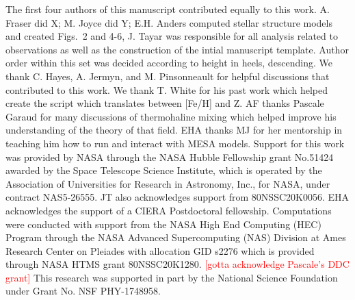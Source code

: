 \documentclass[linenumbers,twocolumn]{aastex62}
\begin{document}
\begin{comment}
\begin{figure}[!htb]
\begin{center}
\texttt{[image: ./Figs/protversusloggmodelpmmPYboth.eps]}%
\caption{The measured core rotation rates for the stars in our sample as a function of gravity compared to the predictions of our solid body model (blue) and our model with a moderately differentially convection zone (pink), showing that these models provide limits on the allowable amount of radial differential rotation in the surface convection zone.}
\label{Fig:bothmodels}
\end{center}
\end{figure}
\end{comment}

\begin{acknowledgements}
The first four authors of this manuscript contributed equally to this work. A. Fraser did X; M. Joyce did Y; E.H. Anders computed stellar structure models and created Figs.~2 and 4-6, J. Tayar was responsible for all analysis related to observations as well as the construction of the intial manuscript template. Author order within this set was decided according to height in heels, descending.   
We thank C. Hayes, A. Jermyn, and M. Pinsonneault for helpful discussions that contributed to this work.  
We thank T. White for his past work which helped create the script which translates between [Fe/H] and Z.
AF thanks Pascale Garaud for many discussions of thermohaline mixing which helped improve his understanding of the theory of that field.
EHA thanks MJ for her mentorship in teaching him how to run and interact with MESA models.
%
Support for this work was provided by NASA through the NASA Hubble Fellowship grant No.51424 awarded by the Space Telescope Science Institute, which is operated by the Association of Universities for Research in Astronomy, Inc., for NASA, under contract NAS5-26555. JT also acknowledges support from 80NSSC20K0056. 
 EHA acknowledges the support of a CIERA Postdoctoral fellowship.
 Computations were conducted with support from the NASA High End Computing (HEC) Program through the NASA Advanced Supercomputing (NAS) Division at Ames Research Center on Pleiades with allocation GID s2276 which is provided through NASA HTMS grant 80NSSC20K1280. \textcolor{red}{[gotta acknowledge Pascale's DDC grant]}
This research was supported in part by the National Science Foundation under Grant No. NSF PHY-1748958.


\end{acknowledgements}
\end{document}
